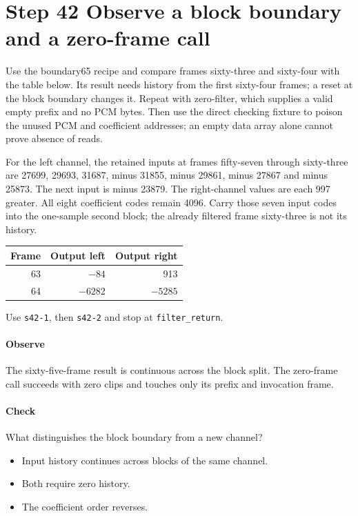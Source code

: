 \section{Step 42 Observe a block boundary and a zero-frame call}\label{pcm-wav-s42}
Use the boundary65 recipe and compare frames sixty-three and sixty-four with the table below. Its result needs history from the first sixty-four frames; a reset at the block boundary changes it. Repeat with zero-filter, which supplies a valid empty prefix and no PCM bytes. Then use the direct checking fixture to poison the unused PCM and coefficient addresses; an empty data array alone cannot prove absence of reads.


For the left channel, the retained inputs at frames fifty-seven through sixty-three
are 27699, 29693, 31687, minus 31855, minus 29861, minus 27867 and minus 25873.
The next input is minus 23879. The right-channel values are each 997 greater.
All eight coefficient codes remain 4096. Carry those seven input codes into the
one-sample second block; the already filtered frame sixty-three is not its history.

\begin{center}
  \begin{tabular}{rrr}
    Frame & Output left & Output right \\
    \hline
    63    & $-84$       & 913          \\
    64    & $-6282$     & $-5285$      \\
  \end{tabular}
\end{center}

Use \texttt{s42-1}, then \texttt{s42-2} and stop at \texttt{filter\_return}.

\paragraph{Observe} The sixty-five-frame result is continuous across the block split. The zero-frame call succeeds with zero clips and touches only its prefix and invocation frame.

\paragraph{Check} What distinguishes the block boundary from a new channel?
\begin{itemize}
  \item[A.] Input history continues across blocks of the same channel.
  \item[B.] Both require zero history.
  \item[C.] The coefficient order reverses.
\end{itemize}
